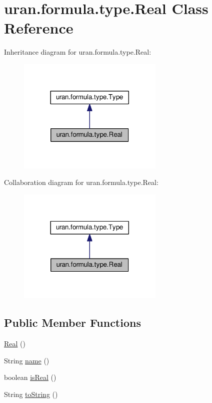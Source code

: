 \hypertarget{classuran_1_1formula_1_1type_1_1_real}{}\section{uran.\+formula.\+type.\+Real Class Reference}
\label{classuran_1_1formula_1_1type_1_1_real}


Inheritance diagram for uran.\+formula.\+type.\+Real\+:
\nopagebreak
\begin{figure}[H]
\begin{center}
\leavevmode
\includegraphics[width=197pt]{classuran_1_1formula_1_1type_1_1_real__inherit__graph}
\end{center}
\end{figure}


Collaboration diagram for uran.\+formula.\+type.\+Real\+:
\nopagebreak
\begin{figure}[H]
\begin{center}
\leavevmode
\includegraphics[width=197pt]{classuran_1_1formula_1_1type_1_1_real__coll__graph}
\end{center}
\end{figure}
\subsection*{Public Member Functions}
\begin{DoxyCompactItemize}
\item 
\hyperlink{classuran_1_1formula_1_1type_1_1_real_a46c3843518e927e8d9d5c50e6f9bb513}{Real} ()
\item 
String \hyperlink{classuran_1_1formula_1_1type_1_1_real_a2504c50ccca8fc93c3bb2de0858c5827}{name} ()
\item 
boolean \hyperlink{classuran_1_1formula_1_1type_1_1_real_a6b2087ef3a458ad634d3600728824d64}{is\+Real} ()
\item 
String \hyperlink{classuran_1_1formula_1_1type_1_1_real_a414c34bdb423a31cc4d6f7eb10547700}{to\+String} ()
\end{DoxyCompactItemize}
